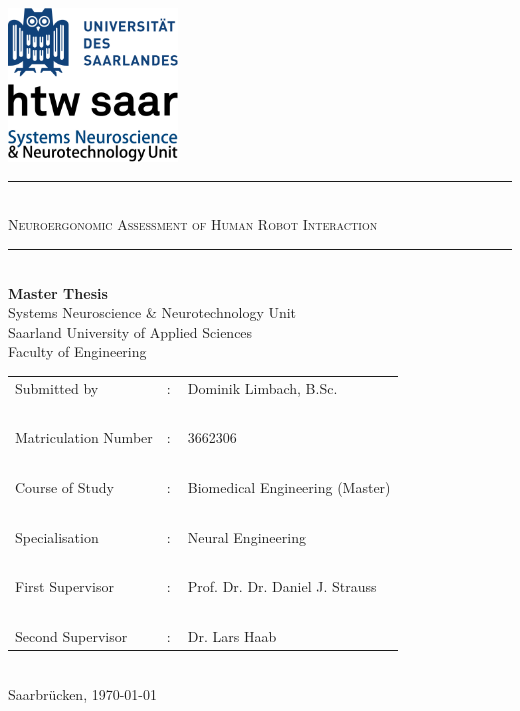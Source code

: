 \documentclass[
    12pt,
    a4paper,
	chapterprefix=false,
	parskip=full,
	headings=normal,
	numbers=noenddot
]{scrreprt}
\begin{document}
\begin{flushright}
	\includegraphics[width=4.5cm]{images/logo}
\end{flushright}

\begin{center}
	\vspace{\fill}
	\rule{\textwidth}{1pt}
	~\\
	\Large
	\textsc{Neuroergonomic Assessment of Human Robot Interaction}\\
    \rule{\textwidth}{1pt}\\
    \vspace{\fill}
    \Large
	\textbf{Master Thesis}\\
	\vspace{\fill}
	\normalsize
	Systems Neuroscience \& Neurotechnology Unit\\
	Saarland University of Applied Sciences\\
	Faculty of Engineering\\
    \vspace{\fill}
	\begin{tabular}{l l l}
		Submitted by & : & Dominik Limbach, B.Sc.\\
		~ & ~ & ~\\
		Matriculation Number & : & 3662306\\
		~ & ~ & ~\\
		Course of Study & : & Biomedical Engineering (Master)\\
		~ & ~ & ~\\
		Specialisation & : & Neural Engineering\\
		~ & ~ & ~\\
		First Supervisor & : & Prof. Dr. Dr. Daniel J. Strauss\\
		~ & ~ & ~\\
		Second Supervisor & : & Dr. Lars Haab\\
	\end{tabular}
	~\\
	\vspace{\fill}
	Saarbrücken, \today
\end{center}
\end{document}
